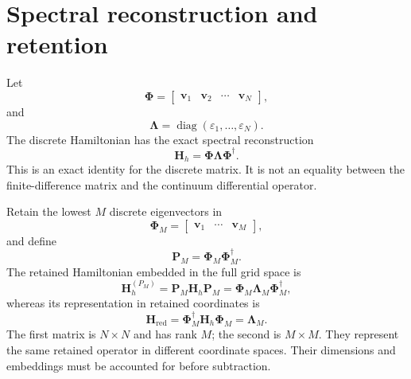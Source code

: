 \section*{Spectral reconstruction and retention}

Let
\begin{equation}
    \boldsymbol\Phi
    =
    \begin{bmatrix}
        \mathbf v_1 & \mathbf v_2 & \cdots & \mathbf v_N
    \end{bmatrix},
\end{equation}
and
\begin{equation}
    \boldsymbol\Lambda
    =
    \operatorname{diag}
    (\varepsilon_1,\ldots,\varepsilon_N).
\end{equation}
The discrete Hamiltonian has the exact spectral reconstruction
\begin{equation}
    \mathbf H_h
    =
    \boldsymbol\Phi
    \boldsymbol\Lambda
    \boldsymbol\Phi^\dagger.
\end{equation}
This is an exact identity for the discrete matrix. It is not an equality
between the finite-difference matrix and the continuum differential operator.

Retain the lowest $M$ discrete eigenvectors in
\begin{equation}
    \boldsymbol\Phi_M
    =
    \begin{bmatrix}
        \mathbf v_1 & \cdots & \mathbf v_M
    \end{bmatrix},
\end{equation}
and define
\begin{equation}
    \mathbf P_M
    =
    \boldsymbol\Phi_M
    \boldsymbol\Phi_M^\dagger.
\end{equation}
The retained Hamiltonian embedded in the full grid space is
\begin{equation}
    \mathbf H_h^{(P_M)}
    =
    \mathbf P_M\mathbf H_h\mathbf P_M
    =
    \boldsymbol\Phi_M
    \boldsymbol\Lambda_M
    \boldsymbol\Phi_M^\dagger,
\end{equation}
whereas its representation in retained coordinates is
\begin{equation}
    \mathbf H_{\mathrm{red}}
    =
    \boldsymbol\Phi_M^\dagger
    \mathbf H_h
    \boldsymbol\Phi_M
    =
    \boldsymbol\Lambda_M.
\end{equation}
The first matrix is $N\times N$ and has rank $M$; the second is $M\times M$.
They represent the same retained operator in different coordinate spaces.
Their dimensions and embeddings must be accounted for before subtraction.

